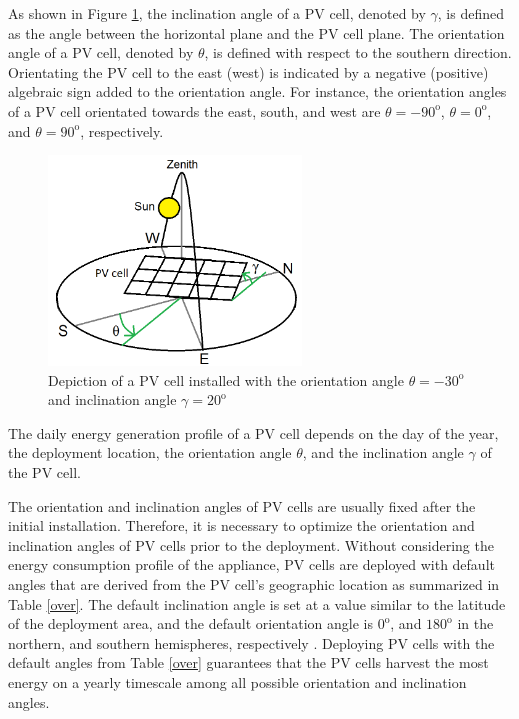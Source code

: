 As shown in Figure \ref{angle}, the inclination angle of a PV cell, denoted by $\gamma$, is defined as the angle between the horizontal plane and the PV cell plane.
The orientation angle of a PV cell, denoted by $\theta$, is defined with respect to the southern direction.  Orientating the PV cell to the east (west) is indicated by a negative (positive) algebraic sign added to the orientation angle. For instance, the orientation angles of a PV cell orientated towards the east, south, and west are $\theta = - 90^{\mathrm{o}}$, $\theta = 0^{\mathrm{o}}$, and $\theta = 90^{\mathrm{o}}$, respectively.

\begin{figure}[H]
	\centering
		\includegraphics[width=0.6\textwidth]{pictures/nnnew}
\caption[Depiction of a PV cell installed with the orientation angle $\theta$ and inclination angle $\gamma$]{Depiction of a PV cell installed with the orientation angle $\theta=-30^{\mathrm{o}}$ and inclination angle $\gamma=20^{\mathrm{o}}$\label{angle}}
\end{figure}

The daily energy generation profile of a PV cell depends on the day of the year, the deployment location, the orientation angle $\theta$, and the inclination angle $\gamma$ of the PV cell.

The orientation and inclination angles of PV cells are usually fixed after the initial installation. Therefore, it is necessary to optimize the orientation and inclination angles of PV cells prior to the deployment. Without considering the energy consumption profile of the appliance, PV cells are deployed with default angles that are derived from the PV cell's geographic location as summarized in Table \ref{over}. The default inclination angle is set at a value similar to the latitude of the deployment area, and the default orientation angle is $0^{\mathrm{o}}$, and $180^{\mathrm{o}}$ in the northern, and southern hemispheres, respectively \cite{Solar_Cell}. Deploying PV cells with the default angles from Table \ref{over} guarantees that the PV cells harvest the most energy on a yearly timescale among all possible orientation and inclination angles. 





